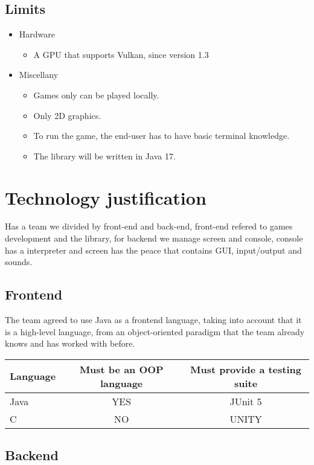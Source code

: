 \documentclass[a4paper,12pt]{article}
\begin{document}
\subsection{Limits}
\begin{itemize}
    \item Hardware
    \begin{itemize}
        \item A GPU that supports Vulkan, since version 1.3
    \end{itemize}
    \item Miscellany
    \begin{itemize}
        \item Games only can be played locally.
        \item Only 2D graphics.
        \item To run the game, the end-user has to have basic terminal knowledge.
        \item The library will be written in Java 17.
    \end{itemize}
\end{itemize}
\section{Technology justification}
Has a team we divided by front-end and back-end, front-end refered to games development and the library, for backend we manage screen and console, console has a interpreter and screen has the peace that contains GUI, input/output and sounds.

\subsection{Frontend}

The team agreed to use Java as a frontend language, taking into account that it is a high-level language, from an object-oriented paradigm that the team already knows and has worked with before.

\begin{tabular}{|l|c|c|}
\hline
Language & Must be an OOP language & Must provide a testing suite \\
\hline
Java & YES & JUnit 5 \\
\hline
C & NO & UNITY \\
\hline
\end{tabular}

\subsection{Backend}
\end{document}
